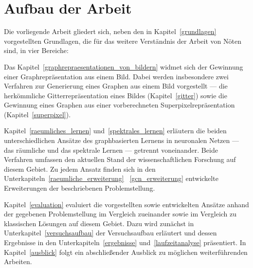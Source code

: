 \section{Aufbau der Arbeit}
\label{aufbau_der_arbeit}

Die vorliegende Arbeit gliedert sich, neben den in Kapitel~\ref{grundlagen} vorgestellten Grundlagen, die für das weitere Verständnis der Arbeit von Nöten sind, in vier Bereiche:

Das Kapitel~\ref{graphrepraesentationen_von_bildern} widmet sich der Gewinnung einer Graphrepräsentation aus einem Bild.
Dabei werden insbesondere zwei Verfahren zur Generierung eines Graphen aus einem Bild vorgestellt — die herkömmliche Gitterrepräsentation eines Bildes (Kapitel~\ref{gitter}) sowie die Gewinnung eines Graphen aus einer vorberechneten Superpixelrepräsentation (Kapitel~\ref{superpixel}).

Kapitel~\ref{raeumliches_lernen} und~\ref{spektrales_lernen} erläutern die beiden unterschiedlichen Ansätze des graphbasierten Lernens in neuronalen Netzen — das räumliche und das spektrale Lernen — getrennt voneinander.
Beide Verfahren umfassen den aktuellen Stand der wissenschaftlichen Forschung auf diesem Gebiet.
Zu jedem Ansatz finden sich in den Unterkapiteln~\ref{raeumliche_erweiterung} \bzw{}~\ref{gcn_erweiterung} entwickelte Erweiterungen \bzgl{} der beschriebenen Problemstellung.

Kapitel~\ref{evaluation} evaluiert die vorgestellten sowie entwickelten Ansätze anhand der gegebenen Problemstellung im Vergleich zueinander sowie im Vergleich zu klassischen Lösungen auf diesem Gebiet.
Dazu wird zunächst in Unterkapitel~\ref{versuchsaufbau} der Versuchsaufbau erläutert und dessen Ergebnisse in den Unterkapiteln~\ref{ergebnisse} und~\ref{laufzeitanalyse} präsentiert.
In Kapitel~\ref{ausblick} folgt ein abschließender Ausblick zu möglichen weiterführenden Arbeiten.
